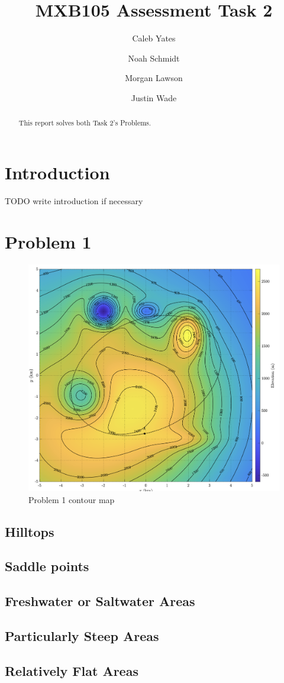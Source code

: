 \documentclass{article}
\title{MXB105 Assessment Task 2}
\author {
    Caleb Yates
    \and
    Noah Schmidt
    \and 
    Morgan Lawson
    \and
    Justin Wade
}
\begin{document}
\maketitle

\begin{abstract}
This report solves both Task 2's Problems.
\end{abstract}

\section{Introduction}

TODO write introduction if necessary

\section{Problem 1}
\begin{figure}[h]
    \centering
    \includegraphics[width=0.25\linewidth]{Problem 1.png}
    \caption{Problem 1 contour map}
    \label{fig:p1-contour-map}
\end{figure}

\subsection{Hilltops}

\subsection{Saddle points}

\subsection{Freshwater or Saltwater Areas}

\subsection{Particularly Steep Areas}

\subsection{Relatively Flat Areas}
\end{document}
